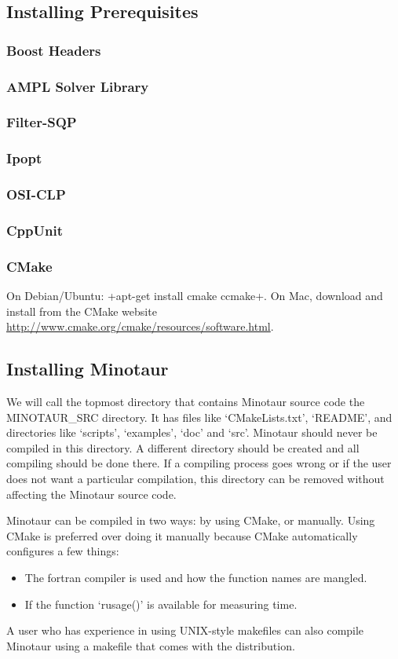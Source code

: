 \subsection{Installing Prerequisites}
\subsubsection{Boost Headers}
\subsubsection{AMPL Solver Library}
\subsubsection{Filter-SQP}
\subsubsection{Ipopt}
\subsubsection{OSI-CLP}
\subsubsection{CppUnit}
\subsubsection{CMake}
On Debian/Ubuntu: \code+apt-get install cmake ccmake+. On Mac, download and
install from the CMake website \url{http://www.cmake.org/cmake/resources/software.html}.
\subsection{Installing Minotaur}
We will call the topmost directory that contains Minotaur source code the
MINOTAUR\_SRC directory. It has files like `CMakeLists.txt', `README', and
directories like `scripts', `examples', `doc' and `src'. Minotaur should never
be compiled in this directory. A different directory should be created and all
compiling should be done there. If a compiling process goes wrong or if the
user does not want a particular compilation, this directory can be removed
without affecting the Minotaur source code. 

Minotaur can be compiled in two ways: by using CMake, or manually.
Using CMake is preferred over doing it manually because CMake
automatically configures a few things:
\begin{itemize}
\item The fortran compiler is used and how the function names are mangled.
\item If the function `rusage()' is available for measuring time.
\end{itemize}
A user who has experience in using UNIX-style makefiles can also compile
Minotaur using a makefile that comes with the distribution.


